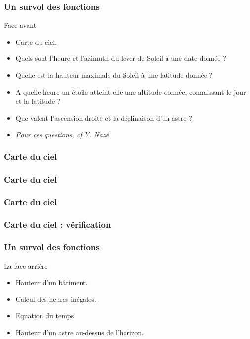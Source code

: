 \documentclass{beamer}
\begin{document}
\begin{frame}\frametitle{Un survol des fonctions}
\begin{block}{Face avant}
\begin{itemize}
\item Carte du ciel.
\item Quels sont l'heure et l'azimuth du lever de Soleil à une date donnée ? 
\item Quelle est la hauteur maximale du Soleil à une latitude donnée ? 
\item A quelle heure un étoile atteint-elle une altitude donnée, connaissant le jour et la latitude ? 
\item Que valent l'ascension droite et la déclinaison d'un astre ? 
\item {\em Pour ces questions, cf Y. Nazé}
\end{itemize}


\end{block}

   \end{frame}
   \begin{frame}\frametitle{Carte du ciel}
\begin{center}
\end{center}
   \end{frame}
   
   
      \begin{frame}\frametitle{Carte du ciel}
\begin{center}
\end{center}
   \end{frame}
 
 
    
        \begin{frame}\frametitle{Carte du ciel}
\begin{center}
\end{center}
   \end{frame}
   
   
\begin{frame}\frametitle{Carte du ciel : vérification}
\begin{center}
\end{center}
   \end{frame}
   \begin{frame}\frametitle{Un survol des fonctions}
   \begin{block}{La face arrière}
   \begin{itemize}
   \item Hauteur d'un bâtiment.
   \item Calcul des heures inégales. 
   \item Equation du temps
   \item Hauteur d'un astre au-dessus de l'horizon. 
   
   \end{itemize}
   
   \end{block}

   \end{frame}
   
\end{document}
